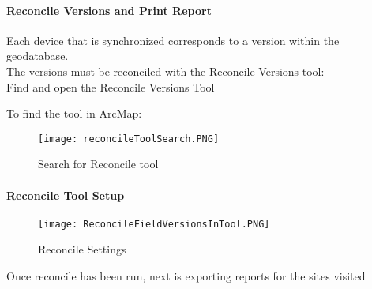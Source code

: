  \clearpage


 \paragraph{Reconcile Versions and Print Report}


 \vspace{.25in}

 Each device that is synchronized corresponds to a version within the geodatabase.\\

 \noindent The versions must be reconciled with the Reconcile Versions tool:\\
  
 \noindent Find and open the Reconcile Versions Tool
  
 \noindent To find the tool {\LARGE in ArcMap:}\\


   \begin{figure}[h!]
   
     \texttt{[image: reconcileToolSearch.PNG]}
 \caption{Search for Reconcile tool}
 
\end{figure}


 \clearpage


 \paragraph{Reconcile Tool Setup}


 \vspace{.2in}





 \vspace{.1in}


 \begin{figure}[h!]
 \centering
     \texttt{[image: ReconcileFieldVersionsInTool.PNG]}
 \caption{Reconcile Settings}

\end{figure}



\noindent Once reconcile has been run, next is exporting reports for the sites visited

